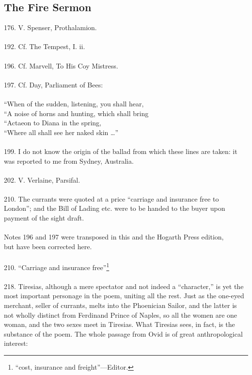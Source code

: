 \documentclass{article}
\begin{document}
\subsection{The Fire Sermon}
176.  V. Spenser, Prothalamion. \\
 \\
192.  Cf.  The Tempest, I.  ii. \\
 \\
196.  Cf.  Marvell, To His Coy Mistress. \\
 \\
197.  Cf.  Day, Parliament of Bees: \\
 \\
\indent     ``When of the sudden, listening, you shall hear, \\
\indent     ``A noise of horns and hunting, which shall bring \\
\indent     ``Actaeon to Diana in the spring, \\
\indent     ``Where all shall see her naked skin \ldots '' \\
 \\
199.  I do not know the origin of the ballad from which these lines
are taken:  it was reported to me from Sydney, Australia. \\
 \\
202.  V. Verlaine, Parsifal. \\
 \\
210.  The currants were quoted at a price ``carriage and insurance
free to London''; and the Bill of Lading etc. were to be handed
to the buyer upon payment of the sight draft. \\
 \\
Notes 196 and 197 were transposed in this and the Hogarth Press edition, \\
but have been corrected here. \\
 \\
210.  ``Carriage and insurance free''\footnote{``cost, insurance and freight''---Editor.} \\
 \\
218.  Tiresias, although a mere spectator and not indeed a ``character,''
is yet the most important personage in the poem, uniting all the rest.
Just as the one-eyed merchant, seller of currants, melts into
the Phoenician Sailor, and the latter is not wholly distinct
from Ferdinand Prince of Naples, so all the women are one woman,
and the two sexes meet in Tiresias.  What Tiresias sees, in fact,
is the substance of the poem.  The whole passage from Ovid is
of great anthropological interest: \\
\end{document}
